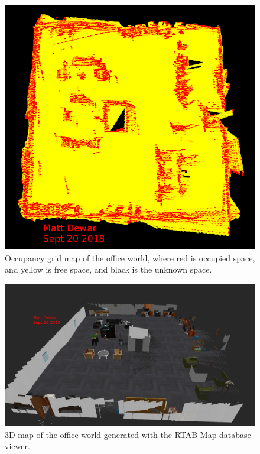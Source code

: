 \documentclass[10pt,journal,compsoc]{IEEEtran}
\begin{document}
\begin{figure}[thpb]
      \centering
      \includegraphics[width=\linewidth]{../img/office_occupancy_map.png}
      \caption{Occupancy grid map of the office world, where red is occupied space, and yellow is free space, and black is the unknown space.}
      \label{fig:occupancyOffice}
\end{figure}

\begin{figure}[thpb]
      \centering
      \includegraphics[width=\linewidth]{../img/3d_map_office.png}
      \caption{3D map of the office world generated with the RTAB-Map database viewer.}
      \label{fig:3DOffice}
\end{figure}
\end{document}

